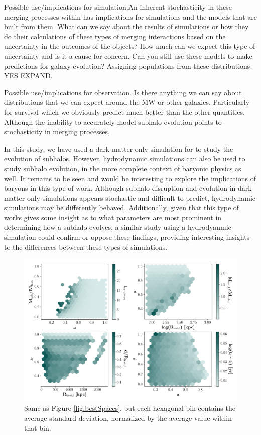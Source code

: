 \documentclass[fleqn,usenatbib]{mnras}
\newcommand\edits[1]{{\color{red}#1}}
\begin{document}
{\edits{Possible use/implications for simulation.}An inherent stochasticity in these merging processes within has implications for simulations and the models that are built from them.  \edits{What can we say about the results of simulations or how they do their calculations of these types of merging interactions based on the uncertainty in the outcomes of the objects? How much can we expect this type of uncertainty and is it a cause for concern.
 Can you still use these models to make predictions for galaxy evolution? Assigning populations from these distributions. YES EXPAND.}

\edits{Possible use/implications for observation. Is there anything we can say about distributions that we can expect around the MW or other galaxies. Particularly for survival which we obviously predict much better than the other quantities.} Although the inability to accurately model subhalo evolution points to stochasticity in merging processes, 

In this study, we have used a dark matter only simulation for to study the evolution of subhalos. However, hydrodynamic simulations can also be used to study subhalo evolution, in the more complete context of baryonic physics as well. It remains to be seen and would be interesting to explore the implications of baryons in this type of work. Although subhalo disruption and evolution in dark matter only simulations appears stochastic and difficult to predict, hydrodynamic simulations may be differently behaved. Additionally, given that this type of works gives some insight as to what parameters are most prominent in determining how a subhalo evolves, a similar study using a hydrodyanmic simulation could confirm or oppose these findings, providing interesting insights to the differences between these types of simulations. 


\begin{figure}
	\includegraphics[width=\textwidth]{Figures/stdev_bestSpaces}
	\vspace{-20pt}
    \caption{Same as Figure \ref{fig:bestSpaces}, but each hexagonal bin contains the average standard deviation, normalized by the average value within that bin.}
    \label{fig:stdev_bestSpaces}
\end{figure}

}
\end{document}
